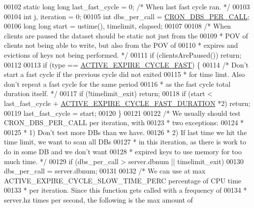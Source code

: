 \begin{DoxyCode}
00102     \textcolor{keyword}{static} \textcolor{keywordtype}{long} \textcolor{keywordtype}{long} last\_fast\_cycle = 0; \textcolor{comment}{/* When last fast cycle ran. */}
00103 
00104     \textcolor{keywordtype}{int} j, iteration = 0;
00105     \textcolor{keywordtype}{int} dbs\_per\_call = \hyperlink{server_8h_aaab0790ee1a625276dce078a9dbbe075}{CRON\_DBS\_PER\_CALL};
00106     \textcolor{keywordtype}{long} \textcolor{keywordtype}{long} start = ustime(), timelimit, elapsed;
00107 
00108     \textcolor{comment}{/* When clients are paused the dataset should be static not just from the}
00109 \textcolor{comment}{     * POV of clients not being able to write, but also from the POV of}
00110 \textcolor{comment}{     * expires and evictions of keys not being performed. */}
00111     \textcolor{keywordflow}{if} (clientsArePaused()) \textcolor{keywordflow}{return};
00112 
00113     \textcolor{keywordflow}{if} (type == \hyperlink{server_8h_ae265e849da28d7e7793659e45579ee11}{ACTIVE\_EXPIRE\_CYCLE\_FAST}) \{
00114         \textcolor{comment}{/* Don't start a fast cycle if the previous cycle did not exited}
00115 \textcolor{comment}{         * for time limt. Also don't repeat a fast cycle for the same period}
00116 \textcolor{comment}{         * as the fast cycle total duration itself. */}
00117         \textcolor{keywordflow}{if} (!timelimit\_exit) \textcolor{keywordflow}{return};
00118         \textcolor{keywordflow}{if} (start < last\_fast\_cycle + \hyperlink{server_8h_a2bf59f8f4da1fa65543af877d632ad63}{ACTIVE\_EXPIRE\_CYCLE\_FAST\_DURATION}
      *2) \textcolor{keywordflow}{return};
00119         last\_fast\_cycle = start;
00120     \}
00121 
00122     \textcolor{comment}{/* We usually should test CRON\_DBS\_PER\_CALL per iteration, with}
00123 \textcolor{comment}{     * two exceptions:}
00124 \textcolor{comment}{     *}
00125 \textcolor{comment}{     * 1) Don't test more DBs than we have.}
00126 \textcolor{comment}{     * 2) If last time we hit the time limit, we want to scan all DBs}
00127 \textcolor{comment}{     * in this iteration, as there is work to do in some DB and we don't want}
00128 \textcolor{comment}{     * expired keys to use memory for too much time. */}
00129     \textcolor{keywordflow}{if} (dbs\_per\_call > server.dbnum || timelimit\_exit)
00130         dbs\_per\_call = server.dbnum;
00131 
00132     \textcolor{comment}{/* We can use at max ACTIVE\_EXPIRE\_CYCLE\_SLOW\_TIME\_PERC percentage of CPU time}
00133 \textcolor{comment}{     * per iteration. Since this function gets called with a frequency of}
00134 \textcolor{comment}{     * server.hz times per second, the following is the max amount of}

\end{DoxyCode}
